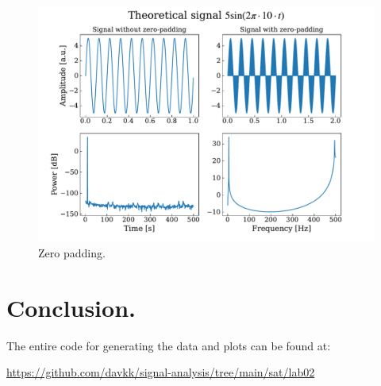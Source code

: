 \documentclass[13pt,a4paper]{article}
\begin{document}
\begin{figure}[ht!]
    \centering
    \includegraphics[width=\linewidth]{upsampling.pdf}
    \caption{Zero padding.}
    \label{fig:upsampling}
\end{figure}


\section{Conclusion.}

The entire code for generating the data and plots can be found at:

\url{https://github.com/davkk/signal-analysis/tree/main/sat/lab02}
\end{document}

